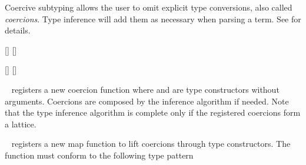 \begin{isabellebody}
\begin{isamarkuptext}
  Coercive subtyping allows the user to omit explicit type
  conversions, also called \emph{coercions}.  Type inference will add
  them as necessary when parsing a term. See
  \cite{traytel-berghofer-nipkow-2011} for details.

  \begin{railoutput}
[]
\rail@bar
{}
[]
\rail@endbar
\rail@end
\end{railoutput}

  \begin{railoutput}
[]
\rail@bar
{}
[]
\rail@endbar
\rail@end
\end{railoutput}


  \begin{description}

  \item \hyperlink{attribute.HOL.coercion}{\mbox{}}~ registers a new
  coercion function  where  and
   are type constructors without arguments.  Coercions are
  composed by the inference algorithm if needed.  Note that the type
  inference algorithm is complete only if the registered coercions
  form a lattice.

  \item \hyperlink{attribute.HOL.coercion-map}{\mbox{}}~ registers a
  new map function to lift coercions through type constructors. The
  function  must conform to the following type pattern


\end{description}
\end{isamarkuptext}
\end{isabellebody}

